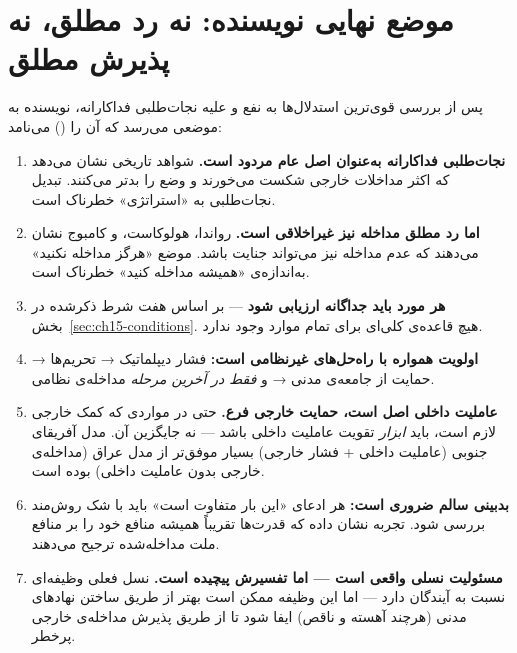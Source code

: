 \section{موضع نهایی نویسنده: نه رد مطلق، نه پذیرش مطلق}
\label{sec:ch15-author-position}


\begin{tcolorbox}[mybox, title={موضع نهایی: واقع‌گرایی انتقادی}]
پس از بررسی قوی‌ترین استدلال‌ها به نفع و علیه نجات‌طلبی فداکارانه، نویسنده به موضعی می‌رسد که آن را  () می‌نامد:

\begin{enumerate}
\item \textbf{نجات‌طلبی فداکارانه به‌عنوان اصل عام مردود است.} شواهد تاریخی نشان می‌دهد که اکثر مداخلات خارجی شکست می‌خورند و وضع را بدتر می‌کنند. تبدیل نجات‌طلبی به «استراتژی» خطرناک است.

\item \textbf{اما رد مطلق مداخله نیز غیراخلاقی است.} رواندا، هولوکاست، و کامبوج نشان می‌دهند که عدم مداخله نیز می‌تواند جنایت باشد. موضع «هرگز مداخله نکنید» به‌اندازه‌ی «همیشه مداخله کنید» خطرناک است.

\item \textbf{هر مورد باید جداگانه ارزیابی شود} — بر اساس هفت شرط ذکرشده در بخش~\ref{sec:ch15-conditions}. هیچ قاعده‌ی کلی‌ای برای تمام موارد وجود ندارد.

\item \textbf{اولویت همواره با راه‌حل‌های غیرنظامی است:} فشار دیپلماتیک → تحریم‌ها → حمایت از جامعه‌ی مدنی → و \textit{فقط در آخرین مرحله} مداخله‌ی نظامی.

\item \textbf{عاملیت داخلی اصل است، حمایت خارجی فرع.} حتی در مواردی که کمک خارجی لازم است، باید \textit{ابزار} تقویت عاملیت داخلی باشد — نه جایگزین آن. مدل آفریقای جنوبی (عاملیت داخلی + فشار خارجی) بسیار موفق‌تر از مدل عراق (مداخله‌ی خارجی بدون عاملیت داخلی) بوده است.

\item \textbf{بدبینی سالم ضروری است:} هر ادعای «این بار متفاوت است» باید با شک روش‌مند بررسی شود. تجربه نشان داده که قدرت‌ها تقریباً همیشه منافع خود را بر منافع ملت مداخله‌شده ترجیح می‌دهند.

\item \textbf{مسئولیت نسلی واقعی است — اما تفسیرش پیچیده است.} نسل فعلی وظیفه‌ای نسبت به آیندگان دارد — اما این وظیفه ممکن است بهتر از طریق ساختن نهادهای مدنی (هرچند آهسته و ناقص) ایفا شود تا از طریق پذیرش مداخله‌ی خارجی پرخطر.
\end{enumerate}
\end{tcolorbox}


